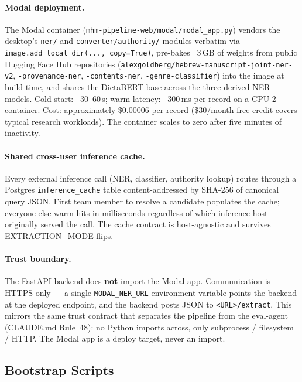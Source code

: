 \documentclass[12pt]{article}
\newcommand{\code}[1]{\texttt{#1}}
\begin{document}
\paragraph{Modal deployment.} The Modal container (\code{mhm-pipeline-web/modal/modal\_app.py}) vendors the desktop's \code{ner/} and \code{converter/authority/} modules verbatim via \code{image.add\_local\_dir(..., copy=True)}, pre-bakes ~3\,GB of weights from public Hugging Face Hub repositories (\code{alexgoldberg/hebrew-manuscript-joint-ner-v2}, \code{-provenance-ner}, \code{-contents-ner}, \code{-genre-classifier}) into the image at build time, and shares the DictaBERT base across the three derived NER models. Cold start: ~30--60\,s; warm latency: ~300\,ms per record on a CPU-2 container. Cost: approximately \$0.00006 per record (\$30/month free credit covers typical research workloads). The container scales to zero after five minutes of inactivity.

\paragraph{Shared cross-user inference cache.} Every external inference call (NER, classifier, authority lookup) routes through a Postgres \code{inference\_cache} table content-addressed by SHA-256 of canonical query JSON. First team member to resolve a candidate populates the cache; everyone else warm-hits in milliseconds regardless of which inference host originally served the call. The cache contract is host-agnostic and survives EXTRACTION\_MODE flips.

\paragraph{Trust boundary.} The FastAPI backend does \textbf{not} import the Modal app. Communication is HTTPS only --- a single \code{MODAL\_NER\_URL} environment variable points the backend at the deployed endpoint, and the backend posts JSON to \code{<URL>/extract}. This mirrors the same trust contract that separates the pipeline from the eval-agent (CLAUDE.md Rule~48): no Python imports across, only subprocess / filesystem / HTTP. The Modal app is a deploy target, never an import.

\subsection{Bootstrap Scripts}
\label{sec:bootstrap}
\end{document}
